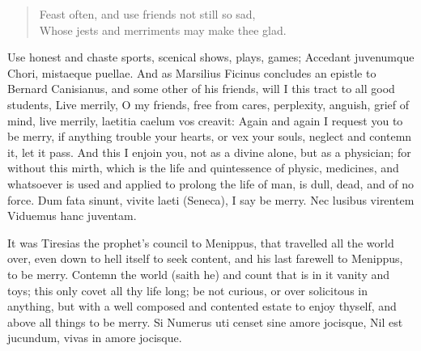 {\begin{verse}
Feast often, and use friends not still so sad,\\
Whose jests and merriments may make thee glad.\\
\end{verse}

Use honest and chaste sports, scenical shows, plays, games; 
Accedant juvenumque Chori, mistaeque puellae. And as Marsilius Ficinus
concludes an epistle to Bernard Canisianus, and some other of his
friends, will I this tract to all good students, Live merrily, O
my friends, free from cares, perplexity, anguish, grief of mind, live
merrily, laetitia caelum vos creavit: Again and again I request
you to be merry, if anything trouble your hearts, or vex your souls,
neglect and contemn it, let it pass. And this I enjoin you,
not as a divine alone, but as a physician; for without this mirth,
which is the life and quintessence of physic, medicines, and whatsoever
is used and applied to prolong the life of man, is dull, dead, and of
no force. Dum fata sinunt, vivite laeti (Seneca), I say be merry.
Nec lusibus virentem
Viduemus hanc juventam.

It was Tiresias the prophet's council to Menippus, that travelled
all the world over, even down to hell itself to seek content, and his
last farewell to Menippus, to be merry. Contemn the world (saith
he) and count that is in it vanity and toys; this only covet all thy
life long; be not curious, or over solicitous in anything, but with a
well composed and contented estate to enjoy thyself, and above all
things to be merry.
Si Numerus uti censet sine amore jocisque,
Nil est jucundum, vivas in amore jocisque.

}
